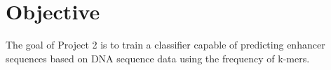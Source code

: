 \section{Objective}
The goal of Project 2 is to train a classifier capable of predicting enhancer sequences
based on DNA sequence data using the frequency of k-mers.


